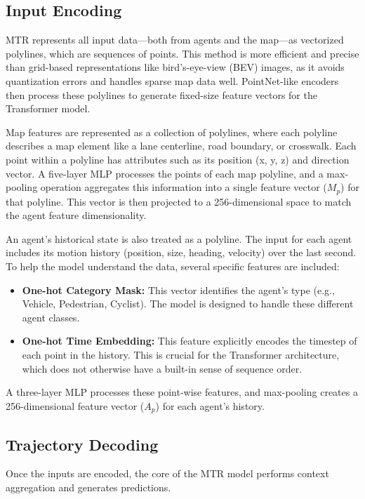 \subsection{Input Encoding}
\label{sec:model_input_encoding}
MTR represents all input data—both from agents and the map—as vectorized polylines, which are sequences of points. This method is more efficient and precise than grid-based representations like bird's-eye-view (BEV) images, as it avoids quantization errors and handles sparse map data well. PointNet-like encoders then process these polylines to generate fixed-size feature vectors for the Transformer model.

Map features are represented as a collection of polylines, where each polyline describes a map element like a lane centerline, road boundary, or crosswalk. Each point within a polyline has attributes such as its position (x, y, z) and direction vector. A five-layer MLP processes the points of each map polyline, and a max-pooling operation aggregates this information into a single feature vector ($M_p$) for that polyline. This vector is then projected to a 256-dimensional space to match the agent feature dimensionality.

An agent's historical state is also treated as a polyline. The input for each agent includes its motion history (position, size, heading, velocity) over the last second. To help the model understand the data, several specific features are included:
\begin{itemize}
    \item \textbf{One-hot Category Mask:} This vector identifies the agent's type (e.g., Vehicle, Pedestrian, Cyclist). The model is designed to handle these different agent classes.
    \item \textbf{One-hot Time Embedding:} This feature explicitly encodes the timestep of each point in the history. This is crucial for the Transformer architecture, which does not otherwise have a built-in sense of sequence order.
\end{itemize}
A three-layer MLP processes these point-wise features, and max-pooling creates a 256-dimensional feature vector ($A_p$) for each agent's history.

\subsection{Trajectory Decoding}
\label{sec:model_decoding}
Once the inputs are encoded, the core of the MTR model performs context aggregation and generates predictions.

